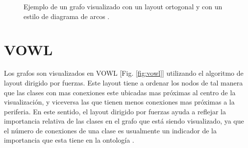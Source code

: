 \begin{figure}[h]
	\centering
	\caption{Ejemplo de un grafo visualizado con un layout ortogonal y con un estilo de diagrama de arcos \cite{bekos2012smooth}.}
	\label{fig:ortogonal}
\end{figure}


\section{VOWL}
Los grafos son visualizados en VOWL \cite{lohmann2016visualizing}[Fig. \ref{fig:vowl}] utilizando el algoritmo de layout dirigido por fuerzas. Este layout tiene a ordenar los nodos de tal manera que las clases con mas conexiones este ubicadas mas próximas al centro de la visualización, y viceversa las que tienen menos conexiones mas próximas a la periferia. En este sentido, el layout dirigido por fuerzas ayuda a reflejar la importancia relativa de las clases en el grafo que está siendo visualizado, ya que el número de conexiones de una clase es usualmente un indicador de la importancia que esta tiene en la ontología \cite{peroni2008identifying}.

